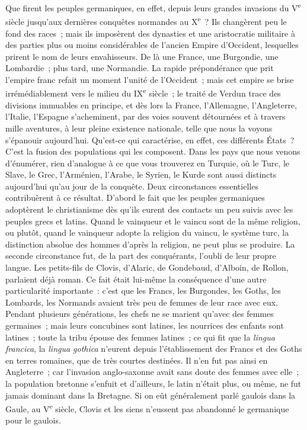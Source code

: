 \documentclass[french,twoside]{book} %
\newcommand\orgName[1]{#1}
\newcommand\persName[1]{#1}
\newcommand\placeName[1]{#1}
\begin{document}
Que firent les {\orgName peuples germaniques}, en effet, depuis leurs grandes invasions du V\textsuperscript{e} siècle jusqu’aux dernières conquêtes normandes au X\textsuperscript{e} ? Ils changèrent peu le fond des races ; mais ils imposèrent des dynasties et une aristocratie militaire à des parties plus ou moins considérables de l’ancien {\orgName Empire d’Occident}, lesquelles prirent le nom de leurs envahisseurs. De là une {\placeName France}, une {\placeName Burgondie}, une {\placeName Lombardie} ; plus tard, une {\placeName Normandie}. La rapide prépondérance que prit l’{\orgName empire franc} refait un moment l’unité de l’{\orgName Occident} ; mais cet empire se brise irrémédiablement vers le milieu du IX\textsuperscript{e} siècle ; le traité de Verdun trace des divisions immuables en principe, et dès lors la {\orgName France}, l’{\orgName Allemagne}, l’{\orgName Angleterre}, l’{\orgName Italie}, l’{\orgName Espagne} s’acheminent, par des voies souvent détournées et à travers mille aventures, à leur pleine existence nationale, telle que nous la voyons s’épanouir aujourd’hui. Qu’est-ce qui caractérise, en effet, ces différents États ? C’est la fusion des populations qui les composent. Dans les pays que nous venons d’énumérer, rien d’analogue à ce que vous trouverez en {\placeName Turquie}, où le Turc, le Slave, le Grec, l’Arménien, l’Arabe, le Syrien, le Kurde sont aussi distincts aujourd’hui qu’au jour de la conquête. Deux circonstances essentielles contribuèrent à ce résultat. D’abord le fait que les {\orgName peuples germaniques} adoptèrent le christianisme dès qu’ils eurent des contacts un peu suivis avec les {\orgName peuples grecs et latins}. Quand le vainqueur et le vaincu sont de la même religion, ou plutôt, quand le vainqueur adopte la religion du vaincu, le système turc, la distinction absolue des hommes d’après la religion, ne peut plus se produire. La seconde circonstance fut, de la part des conquérants, l’oubli de leur propre langue. Les petits-fils de {\persName Clovis}, d’{\persName Alaric}, de {\persName Gondebaud}, d’{\persName Alboin}, de {\persName Rollon}, parlaient déjà roman. Ce fait était lui-même la conséquence d’une autre particularité importante : c’est que les {\orgName Francs}, les {\orgName Burgondes}, les {\orgName Goths}, les {\orgName Lombards}, les {\orgName Normands} avaient très peu de femmes de leur race avec eux. Pendant plusieurs générations, les chefs ne se marient qu’avec des femmes germaines ; mais leurs concubines sont latines, les nourrices des enfants sont latines ; toute la tribu épouse des femmes latines ; ce qui fit que la {\itshape lingua francica}, la {\itshape lingua gothica} n’eurent depuis l’établissement des {\orgName Francs} et des {\orgName Goths} en {\placeName terres romaines}, que de très courtes destinées. Il n’en fut pas ainsi en {\placeName Angleterre} ; car l’invasion anglo-saxonne avait sans doute des femmes avec elle ; la {\orgName population bretonne} s’enfuit et d’ailleurs, le latin n’était plus, ou même, ne fut jamais dominant dans la {\placeName Bretagne}. Si on eût généralement parlé gaulois dans la {\placeName Gaule}, au V\textsuperscript{e} siècle, {\persName Clovis} et les siens n’eussent pas abandonné le germanique pour le gaulois.\par
\end{document}
